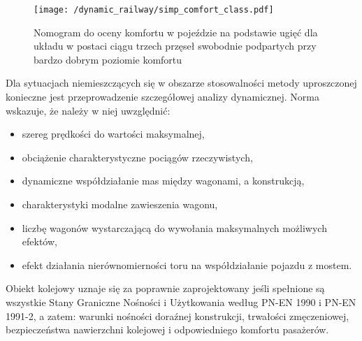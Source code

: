 \begin{figure}[hbt!]
	\centering
	\texttt{[image: /dynamic\_railway/simp\_comfort\_class.pdf]}
	\captionsetup{justification=centering}
	\caption{Nomogram do oceny komfortu w pojeździe na podstawie ugięć dla układu w postaci ciągu trzech przęseł swobodnie podpartych przy bardzo dobrym poziomie komfortu}
	\label{fig:simpl_comfort_clas}
\end{figure}

Dla sytuacjach niemieszczących się w obszarze stosowalności metody uproszczonej konieczne jest przeprowadzenie szczegółowej analizy dynamicznej. Norma wskazuje, że należy w niej uwzględnić:
\begin{itemize}
	\item szereg prędkości do wartości maksymalnej,
	\item obciążenie charakterystyczne pociągów rzeczywistych,
	\item dynamiczne współdziałanie mas między wagonami, a konstrukcją,
	\item charakterystyki modalne zawieszenia wagonu,
	\item liczbę wagonów wystarczającą do wywołania maksymalnych możliwych efektów,
	\item efekt działania nierównomierności toru na współdziałanie pojazdu z mostem.
\end{itemize}

Obiekt kolejowy uznaje się za poprawnie zaprojektowany jeśli spełnione są wszystkie Stany Graniczne Nośności i Użytkowania według PN-EN 1990 i PN-EN 1991-2, a zatem: warunki nośności doraźnej konstrukcji, trwałości zmęczeniowej, bezpieczeństwa nawierzchni kolejowej i odpowiedniego komfortu pasażerów.

